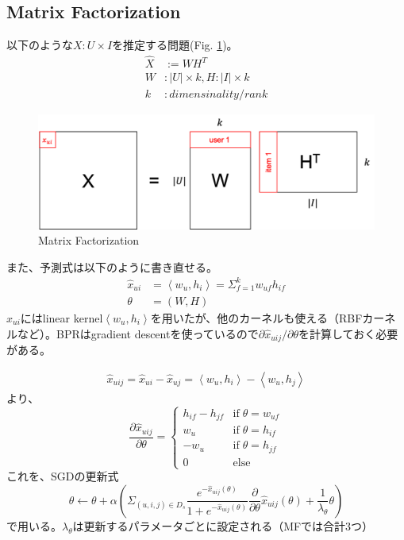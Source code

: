 \documentclass[onecolumn,10pt]{article}
\begin{document}
\subsection{Matrix Factorization}
以下のような$X: U \times I$を推定する問題(Fig. \ref{fig:MF_1})。
\begin{align}
	\hat X &:= WH^T \\
	W &: |U| \times k, H: |I| \times k \\
	k &: dimensinality / rank
\end{align}
\begin{figure}[htbp]
	\centering
	\includegraphics[width=0.5\linewidth]{MF.png}
	\caption{Matrix Factorization}
	\label{fig:MF_1}
\end{figure}

また、予測式は以下のように書き直せる。
\begin{align}
	\hat x_{ui} &= \left<w_u, h_i \right> = \Sigma_{f=1}^{k} w_{uf}h_{if} \\
	\theta &= \left(W, H \right)
\end{align}
$\hat x_{ui}$にはlinear kernel$ \left<w_u, h_i \right>$を用いたが、他のカーネルも使える（RBFカーネルなど）。BPRはgradient descentを使っているので$\partial \hat x_{uij} / \partial \theta$を計算しておく必要がある。

\begin{align}
	\hat x_{uij} = \hat x_{ui} - \hat x_{uj} = \left<w_u, h_i \right> - \left<w_u, h_j \right>
\end{align}
より、
\begin{equation}
	\frac{\partial \hat x_{uij}}{\partial \theta} = \left\{
		\begin{array}{ll}
			h_{if} - h_{jf} & \mathrm{if}\;\theta = w_{uf} \\
			w_u & \mathrm{if}\;\theta = h_{if} \\
			-w_u & \mathrm{if}\;\theta = h_{jf} \\
			0 & \mathrm{else}
		\end{array}
	\right.
\end{equation}
これを、SGDの更新式
\begin{equation}
	\theta \leftarrow \theta + \alpha \left( \Sigma_{(u,i,j) \in D_s} \frac{e^{- \hat x_{uij}(\theta)}}{1+e^{- \hat x_{uij}(\theta)}}\frac{\partial}{\partial \theta} \hat x_{uij} \left(\theta \right) + \frac{1}{\lambda_{\theta}}\theta \right)
\end{equation}
で用いる。$\lambda_\theta$は更新するパラメータごとに設定される（MFでは合計3つ）
\end{document}
